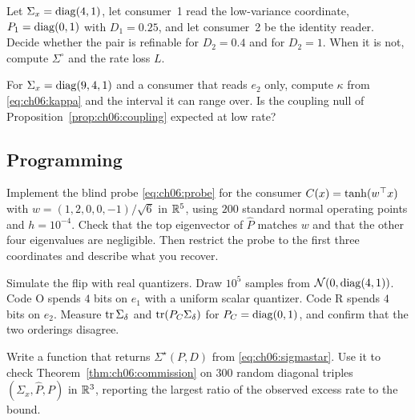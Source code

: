 \begin{exercise}\label{exr:ch06:8}
Let $\Sigma_x=\operatorname{diag}(4,1)$, let consumer~1 read the low-variance coordinate, $P_1=\operatorname{diag}(0,1)$ with $D_1=0.25$, and let consumer~2 be the identity reader. Decide whether the pair is refinable for $D_2=0.4$ and for $D_2=1$. When it is not, compute $\Sigma^\circ$ and the rate loss $L$.
\end{exercise}

\begin{exercise}\label{exr:ch06:9}
For $\Sigma_x=\operatorname{diag}(9,4,1)$ and a consumer that reads $e_2$ only, compute $\kappa$ from \cref{eq:ch06:kappa} and the interval it can range over. Is the coupling null of Proposition~\ref{prop:ch06:coupling} expected at low rate?
\end{exercise}

\subsection*{Programming}

\begin{exercise}\label{exr:ch06:10}
Implement the blind probe \cref{eq:ch06:probe} for the consumer $C(x)=\tanh(w^{\top} x)$ with $w=(1,2,0,0,-1)/\sqrt6$ in $\mathbb{R}^5$, using $200$ standard normal operating points and $h=10^{-4}$. Check that the top eigenvector of $\hat P$ matches $w$ and that the other four eigenvalues are negligible. Then restrict the probe to the first three coordinates and describe what you recover.
\end{exercise}

\begin{exercise}\label{exr:ch06:11}
Simulate the flip with real quantizers. Draw $10^5$ samples from $\mathcal{N}(0,\operatorname{diag}(4,1))$. Code O spends $4$ bits on $e_1$ with a uniform scalar quantizer. Code R spends $4$ bits on $e_2$. Measure $\operatorname{tr}\Sigma_\delta$ and $\operatorname{tr}(P_C\Sigma_\delta)$ for $P_C=\operatorname{diag}(0,1)$, and confirm that the two orderings disagree.
\end{exercise}

\begin{exercise}\label{exr:ch06:12}
Write a function that returns $\Sigma^\star(P,D)$ from \cref{eq:ch06:sigmastar}. Use it to check Theorem~\ref{thm:ch06:commission} on $300$ random diagonal triples $(\Sigma_x,\hat P,P)$ in $\mathbb{R}^3$, reporting the largest ratio of the observed excess rate to the bound.
\end{exercise}

